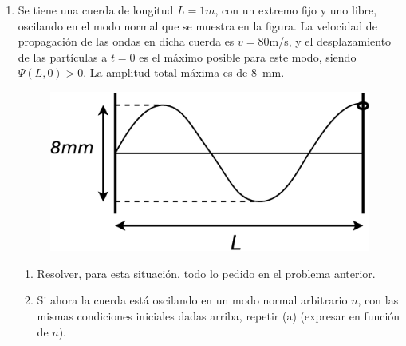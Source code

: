 \documentclass[11pt,spanish,a4paper]{article}
\begin{document}
\begin{enumerate}
\item Se tiene una cuerda de longitud $L=1\unit{m}$, con un extremo fijo y uno
libre, oscilando en el modo normal que se muestra en la figura. La
velocidad de propagación de las ondas en dicha cuerda es $v=80$\unit{m/s},
y el desplazamiento de las partículas a $t=0$ es el máximo posible
para este modo, siendo $\Psi(L,0)>0$. La amplitud total máxima es
de \SI{8}{mm}.
\begin{figure}[H]
\centering{}\includegraphics[clip,scale=0.25]{ej1-33}
\end{figure}
\begin{enumerate}
\item Resolver, para esta situación, todo lo pedido en el problema anterior. 
\item Si ahora la cuerda está oscilando en un modo normal arbitrario $n$,
con las mismas condiciones iniciales dadas arriba, repetir (a) (expresar
en función de $n$). \end{enumerate}
\end{enumerate}
\end{document}
